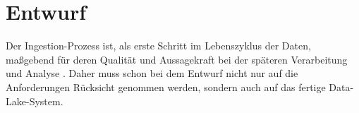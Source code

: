 \chapter{Entwurf}

Der Ingestion-Prozess ist, als erste Schritt im Lebenszyklus der Daten, maßgebend für deren Qualität und Aussagekraft bei der späteren Verarbeitung und Analyse \parencite{ingestion_01}.
Daher muss schon bei dem Entwurf nicht nur auf die Anforderungen Rücksicht genommen werden, sondern auch auf das fertige Data-Lake-System.







